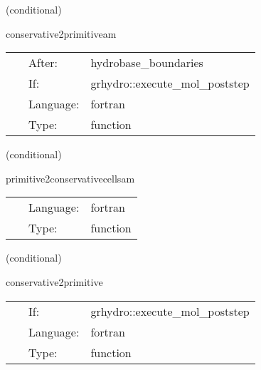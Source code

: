 \documentclass{article}
\begin{document}
\vspace{5mm}

   (conditional) 

\hspace{5mm} conservative2primitiveam 

\hspace{5mm}{\it convert back to primitive variables (general) - mhd with avec version } 


\hspace{5mm}

 \begin{tabular*}{160mm}{cll} 
~ & After:  & hydrobase\_boundaries \\ 
~ & If:  & grhydro::execute\_mol\_poststep \\ 
~ & Language:  & fortran \\ 
~ & Type:  & function \\ 
\end{tabular*} 


\vspace{5mm}

   (conditional) 

\hspace{5mm} primitive2conservativecellsam 

\hspace{5mm}{\it convert initial data given in primive variables to conserved variables - mhd with avec version } 


\hspace{5mm}

 \begin{tabular*}{160mm}{cll} 
~ & Language:  & fortran \\ 
~ & Type:  & function \\ 
\end{tabular*} 


\vspace{5mm}

   (conditional) 

\hspace{5mm} conservative2primitive 

\hspace{5mm}{\it convert back to primitive variables (general) } 


\hspace{5mm}

 \begin{tabular*}{160mm}{cll} 
~ & If:  & grhydro::execute\_mol\_poststep \\ 
~ & Language:  & fortran \\ 
~ & Type:  & function \\ 
\end{tabular*} 
\end{document}
